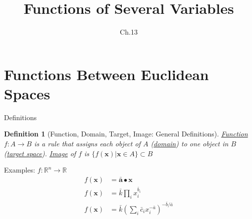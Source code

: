 \documentclass[final]{beamer}
\author[조남운]{\mail}
\title{Functions of Several Variables}
\subtitle{Ch.13}
\newtheorem{defn}{Definition}
\begin{document}
	
\maketitle


\section{Functions Between Euclidean Spaces} %
\label{sec:functions_between_euclidean_spaces}
\begin{frame}[t]{Definitions}
	\begin{defn}
		[Function, Domain, Target, Image: General Definitions]
		\uline{Function} $f:A\rightarrow B$ is a rule that assigns each object of $A$ (\uline{domain}) to one object in $B$ (\uline{target space}). \uline{Image} of $f$ is $\{f(\mathbf{x})\vert \mathbf{x}\in A\}\subset B$
	\end{defn}
	\begin{block}
		{Examples: $f:\mathbb{R}^n\rightarrow\mathbb{R}$}
		\begin{align*}
			f(\mathbf{x})&=\bar{\mathbf{a}}\bullet\mathbf{x}\tag{Linear}\\
			f(\mathbf{x})&=\bar k \prod_i x_i^{\bar b_i} \tag{Cobb-Douglas}\\
			f(\mathbf{x})&=\bar k \left(\sum_i \bar c_i x_i ^{-\bar a}\right)^{-\bar b / \bar a} \tag{CES}
		\end{align*}
	\end{block}
\end{frame}
\end{document}
